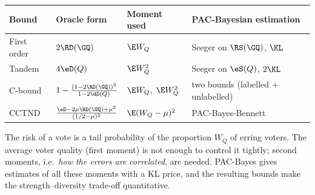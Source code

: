 \begin{center}
\renewcommand{\arraystretch}{1.35}
\begin{tabular}{llll}
\toprule
Bound & Oracle form & Moment used & PAC-Bayesian estimation \\
\midrule
First order & $2\RD(\GQ)$ & $\E W_Q$ & Seeger on $\RS(\GQ)$, $\KL$ \\
Tandem & $4\eD(Q)$ & $\E W_Q^2$ & Seeger on $\eS(Q)$, $2\KL$ \\
C-bound & $1-\frac{(1-2\RD(\GQ))^2}{1-2\dD(Q)}$ & $\E W_Q$, $\E W_Q^2$ & two bounds (labelled $+$ unlabelled) \\
CCTND & $\frac{\eD-2\mu\RD(\GQ)+\mu^2}{(1/2-\mu)^2}$ & $\E(W_Q-\mu)^2$ & PAC-Bayes-Bennett \\
\bottomrule
\end{tabular}
\end{center}

\begin{intuition}
The risk of a vote is a tail probability of the proportion $W_Q$ of erring
voters. The average voter quality (first moment) is not enough to control it
tightly; second moments, i.e.\ \emph{how the errors are correlated}, are
needed. PAC-Bayes gives estimates of all these moments with a KL price, and
the resulting bounds make the strength--diversity trade-off quantitative.
\end{intuition}
